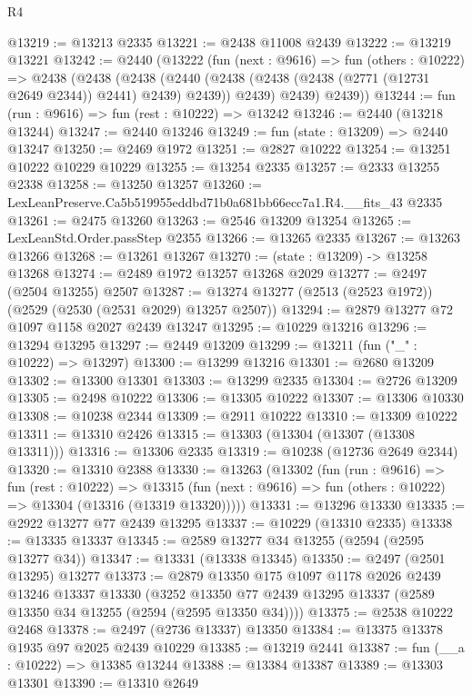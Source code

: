 \begin{lexlean}{R4}
\begin{coremodule}
@13219 := @13213 @2335
@13221 := @2438 @11008 @2439
@13222 := @13219 @13221
@13242 := @2440
    (@13222
      (fun (next : @9616) =>
      fun (others : @10222) =>
      @2438
        (@2438
          (@2438
            (@2440 (@2438 (@2438 (@2438 (@2771 (@12731 @2649 @2344)) @2441) @2439) @2439))
            @2439)
          @2439)
        @2439))
@13244 := fun (run : @9616) => fun (rest : @10222) => @13242
@13246 := @2440 (@13218 @13244)
@13247 := @2440 @13246
@13249 := fun (state : @13209) => @2440 @13247
@13250 := @2469 @1972
@13251 := @2827 @10222
@13254 := @13251 @10222 @10229 @10229
@13255 := @13254 @2335
@13257 := @2333 @13255 @2338
@13258 := @13250 @13257
@13260 := LexLeanPreserve.Ca5b519955eddbd71b0a681bb66ecc7a1.R4.__fits_43 @2335
@13261 := @2475 @13260
@13263 := @2546 @13209 @13254
@13265 := LexLeanStd.Order.passStep @2355
@13266 := @13265 @2335
@13267 := @13263 @13266
@13268 := @13261 @13267
@13270 := (state : @13209) -> @13258 @13268
@13274 := @2489 @1972 @13257 @13268 @2029
@13277 := @2497 (@2504 @13255) @2507
@13287 := @13274 @13277 (@2513 (@2523 @1972)) (@2529 (@2530 (@2531 @2029) @13257 @2507))
@13294 := @2879 @13277 @72 @1097 @1158 @2027 @2439 @13247
@13295 := @10229 @13216
@13296 := @13294 @13295
@13297 := @2449 @13209
@13299 := @13211 (fun ("_" : @10222) => @13297)
@13300 := @13299 @13216
@13301 := @2680 @13209
@13302 := @13300 @13301
@13303 := @13299 @2335
@13304 := @2726 @13209
@13305 := @2498 @10222
@13306 := @13305 @10222
@13307 := @13306 @10330
@13308 := @10238 @2344
@13309 := @2911 @10222
@13310 := @13309 @10222
@13311 := @13310 @2426
@13315 := @13303 (@13304 (@13307 (@13308 @13311)))
@13316 := @13306 @2335
@13319 := @10238 (@12736 @2649 @2344)
@13320 := @13310 @2388
@13330 := @13263
    (@13302
      (fun (run : @9616) =>
      fun (rest : @10222) =>
      @13315 (fun (next : @9616) => fun (others : @10222) => @13304 (@13316 (@13319 @13320)))))
@13331 := @13296 @13330
@13335 := @2922 @13277 @77 @2439 @13295
@13337 := @10229 (@13310 @2335)
@13338 := @13335 @13337
@13345 := @2589 @13277 @34 @13255 (@2594 (@2595 @13277 @34))
@13347 := @13331 (@13338 @13345)
@13350 := @2497 (@2501 @13295) @13277
@13373 := @2879
    @13350
    @175
    @1097
    @1178
    @2026
    @2439
    @13246
    @13337
    @13330
    (@3252 @13350 @77 @2439 @13295 @13337 (@2589 @13350 @34 @13255 (@2594 (@2595 @13350 @34))))
@13375 := @2538 @10222 @2468
@13378 := @2497 (@2736 @13337) @13350
@13384 := @13375 @13378 @1935 @97 @2025 @2439 @10229
@13385 := @13219 @2441
@13387 := fun (__a : @10222) => @13385 @13244
@13388 := @13384 @13387
@13389 := @13303 @13301
@13390 := @13310 @2649

\end{coremodule}
\end{lexlean}
